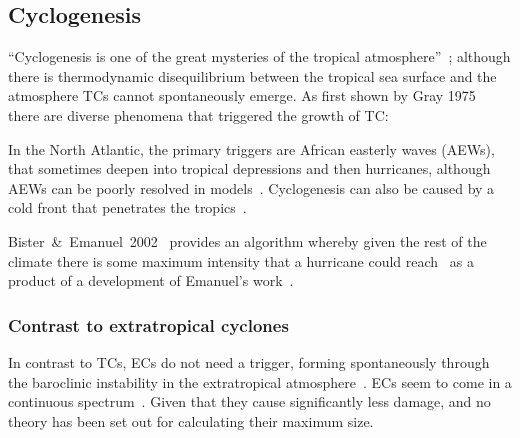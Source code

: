 \subsection{Cyclogenesis}
``Cyclogenesis is one of the great
 mysteries of the tropical atmosphere''~\cite{emanuel2018progress};
although there is thermodynamic disequilibrium between the tropical sea
surface and the atmosphere TCs cannot spontaneously emerge. As first shown by
Gray 1975~\cite{gray1975tropical} there are
 diverse phenomena that triggered the growth of TC:

 In the North Atlantic, the primary triggers are African easterly waves (AEWs),
 that sometimes deepen into tropical depressions and then hurricanes,
 although AEWs can be poorly resolved in models~\cite{tomassini2017interaction}.
 Cyclogenesis can also be caused by a cold front that penetrates the tropics~\cite{emanuel2005divine}.


Bister~\&~Emanuel~2002~\cite{bister2002low} provides an algorithm
 whereby given the rest of the climate
there is some maximum intensity that a hurricane could reach~\cite{bister2002low}
as a product of a development of Emanuel's work~\cite{bister2002low, bister1996development,
bister1998dissipative}.


\subsubsection{Contrast to extratropical cyclones}
In contrast to TCs,  ECs do not need a trigger, forming
spontaneously through the baroclinic instability
in the extratropical atmosphere~\cite{lorenz1960energy}.
ECs seem to come in a continuous spectrum~\cite{emanuel2005divine}.
Given that they cause
significantly less damage, and no theory has been
 set out for calculating their maximum size.
